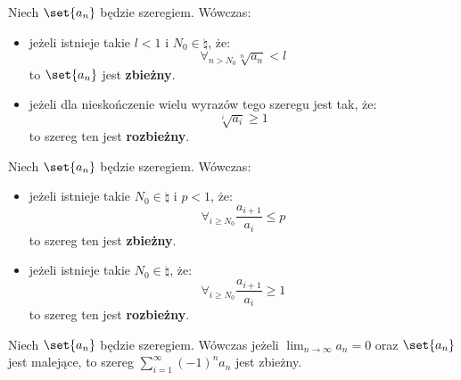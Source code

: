 \begin{fact}
    Niech \(\set{a_n}\) będzie szeregiem. Wówczas: 
    \begin{itemize}[noitemsep]
        \item jeżeli istnieje takie \(l < 1\) i \(N_0 \in \natural \), że: \[
            \forall_{n > N_0} \sqrt[n]{a_n} < l 
        \]
        to \(\set{a_n}\) jest \textbf{zbieżny}.

        \item jeżeli dla nieskończenie wielu wyrazów tego szeregu jest tak, że: \[
            \sqrt[i]{a_i} \geq 1 
        \]
        to szereg ten jest \textbf{rozbieżny}.
    \end{itemize}
\end{fact}
\begin{fact}
    Niech \(\set{a_n}\) będzie szeregiem. Wówczas: 
    \begin{itemize}[noitemsep]
        \item jeżeli istnieje takie \(N_0 \in \natural\) i \(p < 1\), że: 
        \[
           \forall_{i \geq N_0} \frac{a_{i+1}}{a_i} \leq p 
        \]
        to szereg ten jest \textbf{zbieżny}.
        \item jeżeli istnieje takie \(N_0 \in \natural\), że: 
        \[
           \forall_{i \geq N_0} \frac{a_{i+1}}{a_i} \geq 1 
        \]
        to szereg ten jest \textbf{rozbieżny}.
    \end{itemize}
\end{fact}
\begin{fact}
    Niech \( \set{a_n} \) będzie szeregiem. Wówczas jeżeli \(\lim_{n \rightarrow \infty} a_n = 0\) oraz \( \set{a_n} \) jest malejące, to szereg 
    \(
        \sum_{i=1}^{\infty} (-1)^{n} a_n
    \)
    jest zbieżny.
\end{fact}